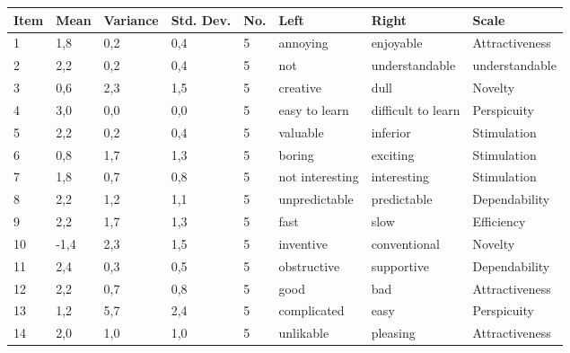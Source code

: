 \documentclass[conference,onecolumn]{IEEEtran}
\begin{document}
    \begin{table}[H]	
        \begin{center}
            \begin{tabular}[H]{ |m{1cm}|m{1cm}|m{1.2cm}|m{1.2cm}|m{1cm}|m{2cm}|m{3cm}|m{2cm}|}
                \hline
                \textbf{Item}&\textbf{Mean} &\textbf{Variance} &\textbf{Std. Dev.}  &\textbf{No.}  &\textbf{Left} &\textbf{Right} &\textbf{Scale}\\ \hline
                1	&1,8	&0,2	&0,4	&5	&annoying	            &enjoyable	                &Attractiveness             \\ \hline
                2	&2,2	&0,2	&0,4	&5	&not                    &understandable	            &understandable         \\ \hline
                3	&0,6	&2,3	&1,5	&5	&creative	            &dull	                    &Novelty        \\ \hline
                4	&3,0	&0,0	&0,0	&5	&easy to learn	        &difficult to learn	        &Perspicuity        \\ \hline
                5	&2,2	&0,2	&0,4	&5	&valuable	            &inferior	                &Stimulation        \\ \hline
                6	&0,8	&1,7	&1,3	&5	&boring	                &exciting	                &Stimulation        \\ \hline
                7	&1,8	&0,7	&0,8	&5	&not interesting	    &interesting	            &Stimulation        \\ \hline
                8	&2,2	&1,2	&1,1	&5	&unpredictable	        &predictable	            &Dependability      \\ \hline
                9	&2,2	&1,7	&1,3	&5	&fast	                &slow	                    &Efficiency     \\ \hline
                10	&-1,4	&2,3	&1,5	&5	&inventive	            &conventional	            &Novelty        \\ \hline
                11	&2,4	&0,3	&0,5	&5	&obstructive	        &supportive	                &Dependability      \\ \hline
                12	&2,2	&0,7	&0,8	&5	&good	                &bad	                    &Attractiveness     \\ \hline
                13	&1,2	&5,7	&2,4	&5	&complicated	        &easy	                    &Perspicuity        \\ \hline
                14	&2,0	&1,0	&1,0	&5	&unlikable	            &pleasing	                &Attractiveness     \\ \hline

\end{tabular}
\end{center}
\end{table}
\end{document}
